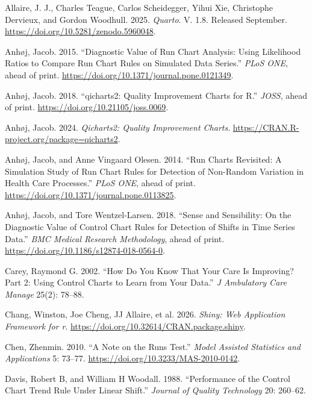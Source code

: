 \documentclass[
]{book}
\newlength{\cslhangindent}
\newenvironment{CSLReferences}[2] %
 {\begin{list}{}{%
  \setlength{\itemindent}{0pt}
  \setlength{\leftmargin}{0pt}
  \setlength{\parsep}{0pt}
  \ifodd #1
   \setlength{\leftmargin}{\cslhangindent}
   \setlength{\itemindent}{-1\cslhangindent}
  \fi
  \setlength{\itemsep}{#2\baselineskip}}}
 {\end{list}}
\begin{document}
\protect{}\label{refs}
\begin{CSLReferences}{1}{1}
Allaire, J. J., Charles Teague, Carlos Scheidegger, Yihui Xie, Christophe Dervieux, and Gordon Woodhull. 2025. \emph{{Quarto}}. V. 1.8. Released September. \url{https://doi.org/10.5281/zenodo.5960048}.

Anhøj, Jacob. 2015. {``Diagnostic Value of Run Chart Analysis: Using Likelihood Ratios to Compare Run Chart Rules on Simulated Data Series.''} \emph{PLoS ONE}, ahead of print. \url{https://doi.org/10.1371/journal.pone.0121349}.

Anhøj, Jacob. 2018. {``{q}icharts2: Quality Improvement Charts for {R}.''} \emph{JOSS}, ahead of print. \url{https://doi.org/10.21105/joss.0069}.

Anhøj, Jacob. 2024. \emph{Qicharts2: Quality Improvement Charts}. \url{https://CRAN.R-project.org/package=qicharts2}.

Anhøj, Jacob, and Anne Vingaard Olesen. 2014. {``Run Charts Revisited: A Simulation Study of Run Chart Rules for Detection of Non-Random Variation in Health Care Processes.''} \emph{PLoS ONE}, ahead of print. \url{https://doi.org/10.1371/journal.pone.0113825}.

Anhøj, Jacob, and Tore Wentzel-Larsen. 2018. {``Sense and Sensibility: On the Diagnostic Value of Control Chart Rules for Detection of Shifts in Time Series Data.''} \emph{BMC Medical Research Methodology}, ahead of print. \url{https://doi.org/10.1186/s12874-018-0564-0}.

Carey, Raymond G. 2002. {``How Do You Know That Your Care Is Improving? Part 2: Using Control Charts to Learn from Your Data.''} \emph{J Ambulatory Care Manage} 25(2): 78--88.

Chang, Winston, Joe Cheng, JJ Allaire, et al. 2026. \emph{Shiny: Web Application Framework for r}. \url{https://doi.org/10.32614/CRAN.package.shiny}.

Chen, Zhenmin. 2010. {``A Note on the Runs Test.''} \emph{Model Assisted Statistics and Applications} 5: 73--77. \url{https://doi.org/10.3233/MAS-2010-0142}.

Davis, Robert B, and William H Woodall. 1988. {``Performance of the Control Chart Trend Rule Under Linear Shift.''} \emph{Journal of Quality Technology} 20: 260--62.


\end{CSLReferences}
\end{document}
